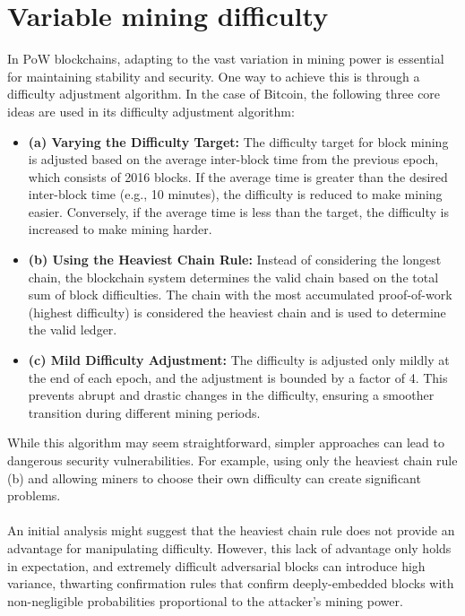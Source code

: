 \documentclass{report}
\begin{document}
\section{Variable mining difficulty}
In PoW blockchains, adapting to the vast variation in mining power is essential for maintaining stability and security. One way to achieve this is through a difficulty adjustment algorithm. In the case of Bitcoin, the following three core ideas are used in its difficulty adjustment algorithm:\\
\begin{itemize}
	\item \textbf{(a) Varying the Difficulty Target: }The difficulty target for block mining is adjusted based on the average inter-block time from the previous epoch, which consists of 2016 blocks. If the average time is greater than the desired inter-block time (e.g., 10 minutes), the difficulty is reduced to make mining easier. Conversely, if the average time is less than the target, the difficulty is increased to make mining harder.
	\item \textbf{(b) Using the Heaviest Chain Rule: }Instead of considering the longest chain, the blockchain system determines the valid chain based on the total sum of block difficulties. The chain with the most accumulated proof-of-work (highest difficulty) is considered the heaviest chain and is used to determine the valid ledger.
	\item \textbf{(c) Mild Difficulty Adjustment: }The difficulty is adjusted only mildly at the end of each epoch, and the adjustment is bounded by a factor of 4. This prevents abrupt and drastic changes in the difficulty, ensuring a smoother transition during different mining periods.
\end{itemize}
While this algorithm may seem straightforward, simpler approaches can lead to dangerous security vulnerabilities. For example, using only the heaviest chain rule (b) and allowing miners to choose their own difficulty can create significant problems.\\\\
An initial analysis might suggest that the heaviest chain rule does not provide an advantage for manipulating difficulty. However, this lack of advantage only holds in expectation, and extremely difficult adversarial blocks can introduce high variance, thwarting confirmation rules that confirm deeply-embedded blocks with non-negligible probabilities proportional to the attacker's mining power\cite{reference1}.\\\\
\end{document}
